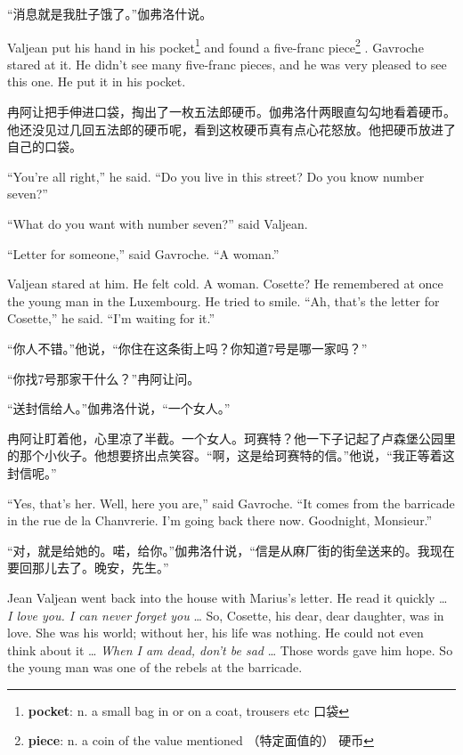 \documentclass[fontset=ubuntu, zihao=5]{ctexart}
\begin{document}
\begin{paracol}{2}
“消息就是我肚子饿了。”伽弗洛什说。

\switchcolumn*

Valjean put his hand in his pocket\footnote{\textbf{pocket}: n. a small bag
  in or on a coat, trousers etc 口袋} and found a five-franc
piece\footnote{\textbf{piece}: n. a coin of the value mentioned （特定面值的）
  硬币} . Gavroche stared at it. He didn't see many five-franc pieces, and
he was very pleased to see this one. He put it in his pocket.

\switchcolumn

冉阿让把手伸进口袋，掏出了一枚五法郎硬币。伽弗洛什两眼直勾勾地看着硬币。他还没见过几回五法郎的硬币呢，看到这枚硬币真有点心花怒放。他把硬币放进了自己的口袋。

\switchcolumn*

``You're all right,'' he said. ``Do you live in this street? Do you know number seven?''

``What do you want with number seven?'' said Valjean.

``Letter for someone,'' said Gavroche. ``A woman.''

Valjean stared at him. He felt cold. A woman. Cosette? He remembered at once the young man in the Luxembourg. He tried to smile. ``Ah, that's the letter for Cosette,'' he said. ``I'm waiting for it.''

\switchcolumn

“你人不错。”他说，“你住在这条街上吗？你知道7号是哪一家吗？”

“你找7号那家干什么？”冉阿让问。

“送封信给人。”伽弗洛什说，“一个女人。”

冉阿让盯着他，心里凉了半截。一个女人。珂赛特？他一下子记起了卢森堡公园里的那个小伙子。他想要挤出点笑容。“啊，这是给珂赛特的信。”他说，“我正等着这封信呢。”

\switchcolumn*

``Yes, that's her. Well, here you are,'' said Gavroche. ``It comes from the barricade in the rue de la Chanvrerie. I'm going back there now. Goodnight, Monsieur.''


\switchcolumn

“对，就是给她的。喏，给你。”伽弗洛什说，“信是从麻厂街的街垒送来的。我现在要回那儿去了。晚安，先生。”

\switchcolumn*

Jean Valjean went back into the house with Marius's letter. He read it quickly \ldots{} \emph{I love you. I can never forget you} \ldots{} So, Cosette, his dear, dear daughter, was in love. She was his world; without her, his life was nothing. He could not even think about it \ldots{} \emph{When I am dead, don't be sad} \ldots{} Those words gave him hope. So the young man was one of the rebels at the barricade.


\end{paracol}
\end{document}
